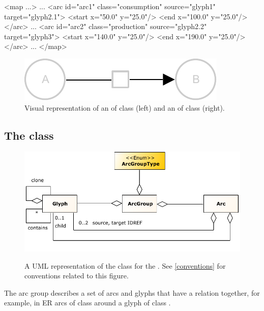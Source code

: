 \begin{example}
<map ...>
    ...
    <arc id="arc1" class="consumption" source="glyph1" target="glyph2.1">
        <start x="50.0" y="25.0"/>
        <end x="100.0" y="25.0"/>
    </arc>
    ...
    <arc id="arc2" class="production" source="glyph2.2" target="glyph3">
        <start x="140.0" y="25.0"/>
        <end x="190.0" y="25.0"/>
    </arc>
    ...
</map>
\end{example}

\begin{figure}[!ht]
  \centering
  \includegraphics[scale=0.9]{figures/arc_example.pdf}
\caption{Visual representation of an \Arc of class  (left) and an \Arc of class  (right).}
  \label{fig:arc_example}
\end{figure}


\subsection{The  class}
\label{arcgroup-class}

\begin{figure}[ht!]
  \centering
  \includegraphics[scale=1.0]{figures/sbgnml_arcgroup_uml.pdf}\\
\caption{A UML representation of the \ArcGroup class for the
\SbgnmlPackage. See \ref{conventions} for conventions related to this
figure. }
  \label{fig:sbgnml_arcgroup_uml}
\end{figure}


The arc group describes a set of arcs and glyphs that have a relation together, for example, in ER arcs of class  around a glyph of class .

